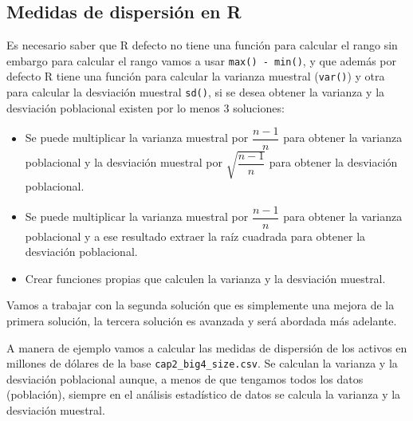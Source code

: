 \documentclass[]{book}
\providecommand{\tightlist}{%
  \setlength{\itemsep}{0pt}\setlength{\parskip}{0pt}}
\begin{document}
\subsection{Medidas de dispersión en
R}\label{medidas-de-dispersion-en-r}

Es necesario saber que R defecto no tiene una función para calcular el
rango sin embargo para calcular el rango vamos a usar
\texttt{max()\ -\ min()}, y que además por defecto R tiene una función
para calcular la varianza muestral (\texttt{var()}) y otra para calcular
la desviación muestral \texttt{sd()}, si se desea obtener la varianza y
la desviación poblacional existen por lo menos 3 soluciones:

\begin{itemize}
\tightlist
\item
  Se puede multiplicar la varianza muestral por \(\dfrac{n-1}{n}\) para
  obtener la varianza poblacional y la desviación muestral por
  \(\sqrt{\dfrac{n-1}{n}}\) para obtener la desviación poblacional.
\item
  Se puede multiplicar la varianza muestral por \(\dfrac{n-1}{n}\) para
  obtener la varianza poblacional y a ese resultado extraer la raíz
  cuadrada para obtener la desviación poblacional.
\item
  Crear funciones propias que calculen la varianza y la desviación
  muestral.
\end{itemize}

Vamos a trabajar con la segunda solución que es simplemente una mejora
de la primera solución, la tercera solución es avanzada y será abordada
más adelante.

A manera de ejemplo vamos a calcular las medidas de dispersión de los
activos en millones de dólares de la base \texttt{cap2\_big4\_size.csv}.
Se calculan la varianza y la desviación poblacional aunque, a menos de
que tengamos todos los datos (población), siempre en el análisis
estadístico de datos se calcula la varianza y la desviación muestral.
\end{document}
